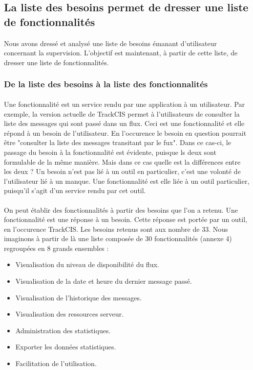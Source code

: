 	\subsection{La liste des besoins permet de dresser une liste de fonctionnalités}
		\paragraph{}%
		Nous avons dressé et analysé une liste de besoins émanant d'utilisateur
		concernant la supervision. L'objectif est maintenant, à partir de cette liste,
		de dresser une liste de fonctionnalités.
		
		\subsubsection{De la liste des besoins à la liste des fonctionnalités}
			\paragraph{}%
			Une fonctionnalité est un service rendu par une application à un utilisateur.
			Par exemple, la version actuelle de TrackCIS permet à l'utilisateurs de
			consulter la liste des messages qui sont passé dans un flux. Ceci est une
			fonctionnalité et elle répond à un besoin de l'utilisateur. En l'occurence le
			besoin en question pourrait être "consulter la liste des messages transitant
			par le fux". Dans ce cas-ci, le passage du besoin à la fonctionnalité est
			évidente, puisque ls deux sont formulable de la même manière. Mais dans ce
			cas quelle est la différences entre les deux ? Un besoin n'est pas lié à un
			outil en particulier, c'est une volonté de l'utilisateur lié à un manque. Une
			fonctionnalité est elle liée à un outil particulier, puisqu'il s'agit d'un
			service rendu par cet outil.
		
			\paragraph{}%
			On peut établir des fonctionnalités à partir des besoins que l'on a retenu.
			Une fonctionnalité est une réponse à un besoin. Cette réponse est portée par
			un outil, en l'occurence TrackCIS. Les besoins retenus sont aux nombre de 33.
			Nous imaginons à partir de là une liste composée de 30 fonctionnalités
			(annexe 4) regroupées en 8 grands ensembles :
			\begin{itemize}
			  \item Visualisation du niveau de disponibilité du flux.
			  \item Visualisation de la date et heure du dernier message passé.
			  \item Visualisation de l’historique des messages.
			  \item Visualisation des ressources serveur.
			  \item Administration des statistiques.
			  \item Exporter les données statistiques.
			  \item Facilitation de l’utilisation.
			\end{itemize}
			
